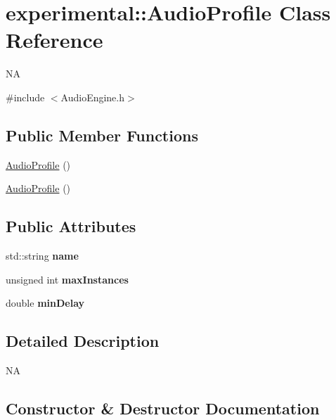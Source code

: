 \hypertarget{classexperimental_1_1AudioProfile}{}\section{experimental\+:\+:Audio\+Profile Class Reference}
\label{classexperimental_1_1AudioProfile}


NA  




{\ttfamily \#include $<$Audio\+Engine.\+h$>$}

\subsection*{Public Member Functions}
\begin{DoxyCompactItemize}
\item 
\hyperlink{classexperimental_1_1AudioProfile_a209e96757b21ff3b7fd6d480c4b6d4ae}{Audio\+Profile} ()
\item 
\hyperlink{classexperimental_1_1AudioProfile_a209e96757b21ff3b7fd6d480c4b6d4ae}{Audio\+Profile} ()
\end{DoxyCompactItemize}
\subsection*{Public Attributes}
\begin{DoxyCompactItemize}
\item 
\mbox{\label{classexperimental_1_1AudioProfile_a7c22159f412e10eff6d14111dd7b9f5e}} 
std\+::string {\bfseries name}
\item 
\mbox{\label{classexperimental_1_1AudioProfile_a4f118cedfd5b217d0968e41492479327}} 
unsigned int {\bfseries max\+Instances}
\item 
\mbox{\label{classexperimental_1_1AudioProfile_a05eeefeabc4f22f23a36d0da3960a167}} 
double {\bfseries min\+Delay}
\end{DoxyCompactItemize}


\subsection{Detailed Description}
NA 

\subsection{Constructor \& Destructor Documentation}
\mbox{\label{classexperimental_1_1AudioProfile_a209e96757b21ff3b7fd6d480c4b6d4ae}} 
